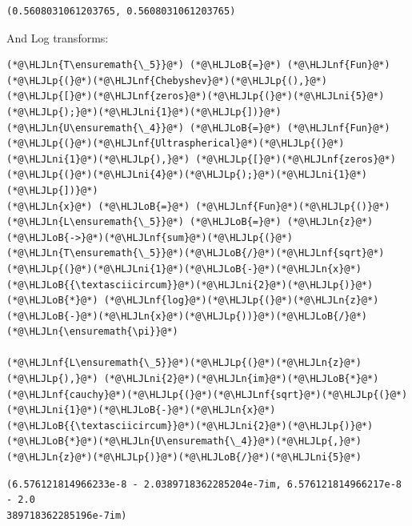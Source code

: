 \documentclass[12pt,a4paper]{article}
\newcommand{\HLJLn}[1]{#1}
\newcommand{\HLJLnf}[1]{\textcolor[RGB]{66,102,213}{#1}}
\newcommand{\HLJLni}[1]{\textcolor[RGB]{59,151,46}{#1}}
\newcommand{\HLJLoB}[1]{\textcolor[RGB]{102,102,102}{\textbf{#1}}}
\newcommand{\HLJLp}[1]{#1}
\begin{document}
\begin{lstlisting}
(0.5608031061203765, 0.5608031061203765)
\end{lstlisting}


And Log transforms:


\begin{lstlisting}
(*@\HLJLn{T\ensuremath{\_5}}@*) (*@\HLJLoB{=}@*) (*@\HLJLnf{Fun}@*)(*@\HLJLp{(}@*)(*@\HLJLnf{Chebyshev}@*)(*@\HLJLp{(),}@*) (*@\HLJLp{[}@*)(*@\HLJLnf{zeros}@*)(*@\HLJLp{(}@*)(*@\HLJLni{5}@*)(*@\HLJLp{);}@*)(*@\HLJLni{1}@*)(*@\HLJLp{])}@*)
(*@\HLJLn{U\ensuremath{\_4}}@*) (*@\HLJLoB{=}@*) (*@\HLJLnf{Fun}@*)(*@\HLJLp{(}@*)(*@\HLJLnf{Ultraspherical}@*)(*@\HLJLp{(}@*)(*@\HLJLni{1}@*)(*@\HLJLp{),}@*) (*@\HLJLp{[}@*)(*@\HLJLnf{zeros}@*)(*@\HLJLp{(}@*)(*@\HLJLni{4}@*)(*@\HLJLp{);}@*)(*@\HLJLni{1}@*)(*@\HLJLp{])}@*)
(*@\HLJLn{x}@*) (*@\HLJLoB{=}@*) (*@\HLJLnf{Fun}@*)(*@\HLJLp{()}@*)
(*@\HLJLn{L\ensuremath{\_5}}@*) (*@\HLJLoB{=}@*) (*@\HLJLn{z}@*)(*@\HLJLoB{->}@*)(*@\HLJLnf{sum}@*)(*@\HLJLp{(}@*)(*@\HLJLn{T\ensuremath{\_5}}@*)(*@\HLJLoB{/}@*)(*@\HLJLnf{sqrt}@*)(*@\HLJLp{(}@*)(*@\HLJLni{1}@*)(*@\HLJLoB{-}@*)(*@\HLJLn{x}@*)(*@\HLJLoB{{\textasciicircum}}@*)(*@\HLJLni{2}@*)(*@\HLJLp{)}@*) (*@\HLJLoB{*}@*) (*@\HLJLnf{log}@*)(*@\HLJLp{(}@*)(*@\HLJLn{z}@*)(*@\HLJLoB{-}@*)(*@\HLJLn{x}@*)(*@\HLJLp{))}@*)(*@\HLJLoB{/}@*)(*@\HLJLn{\ensuremath{\pi}}@*)

(*@\HLJLnf{L\ensuremath{\_5}}@*)(*@\HLJLp{(}@*)(*@\HLJLn{z}@*)(*@\HLJLp{),}@*) (*@\HLJLni{2}@*)(*@\HLJLn{im}@*)(*@\HLJLoB{*}@*)(*@\HLJLnf{cauchy}@*)(*@\HLJLp{(}@*)(*@\HLJLnf{sqrt}@*)(*@\HLJLp{(}@*)(*@\HLJLni{1}@*)(*@\HLJLoB{-}@*)(*@\HLJLn{x}@*)(*@\HLJLoB{{\textasciicircum}}@*)(*@\HLJLni{2}@*)(*@\HLJLp{)}@*)(*@\HLJLoB{*}@*)(*@\HLJLn{U\ensuremath{\_4}}@*)(*@\HLJLp{,}@*)(*@\HLJLn{z}@*)(*@\HLJLp{)}@*)(*@\HLJLoB{/}@*)(*@\HLJLni{5}@*)
\end{lstlisting}

\begin{lstlisting}
(6.576121814966233e-8 - 2.0389718362285204e-7im, 6.576121814966217e-8 - 2.0
389718362285196e-7im)
\end{lstlisting}
\end{document}
